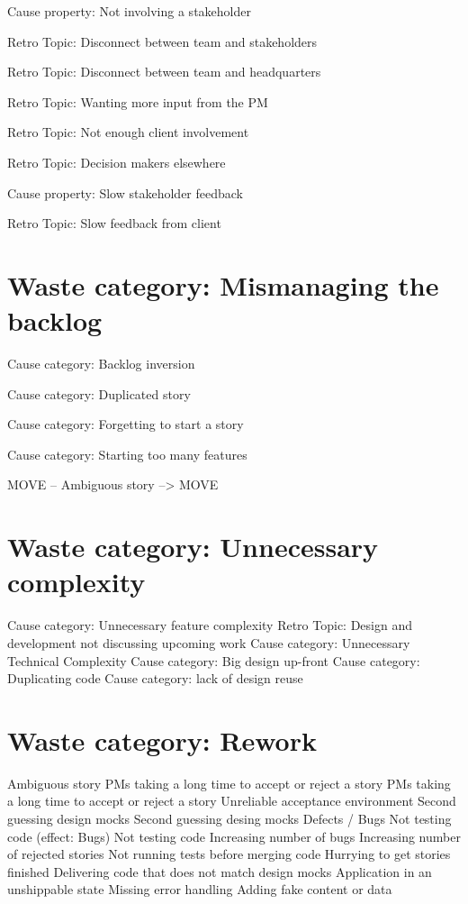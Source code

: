 \quad \quad Cause property: Not involving a stakeholder

\quad \quad \quad Retro Topic: Disconnect between team and stakeholders

\quad \quad \quad Retro Topic: Disconnect between team and headquarters

\quad \quad \quad Retro Topic: Wanting more input from the PM

\quad \quad \quad Retro Topic: Not enough client involvement

\quad \quad \quad Retro Topic: Decision makers elsewhere

\quad \quad Cause property: Slow stakeholder feedback

\quad \quad \quad Retro Topic: Slow feedback from client

\section{Waste category: Mismanaging the backlog}
\quad Cause category: Backlog inversion

\quad Cause category: Duplicated story

\quad Cause category: Forgetting to start a story

\quad Cause category: Starting too many features

MOVE -- Ambiguous story --> MOVE

\section{Waste category: Unnecessary complexity}
\quad Cause category: Unnecessary feature complexity
\quad \quad Retro Topic: Design and development not discussing upcoming work
\quad Cause category: Unnecessary Technical Complexity
\quad Cause category: Big design up-front
\quad Cause category: Duplicating code
\quad Cause category: lack of design reuse

\section{Waste category: Rework}
Ambiguous story
PMs taking a long time to accept or reject a story
PMs taking a long time to accept or reject a story
Unreliable acceptance environment
Second guessing design mocks
Second guessing desing mocks
Defects / Bugs
Not testing code (effect: Bugs)
Not testing code
Increasing number of bugs
Increasing number of rejected stories
Not running tests before merging code
Hurrying to get stories finished
Delivering code that does not match design mocks
Application in an unshippable state
Missing error handling
Adding fake content or data

